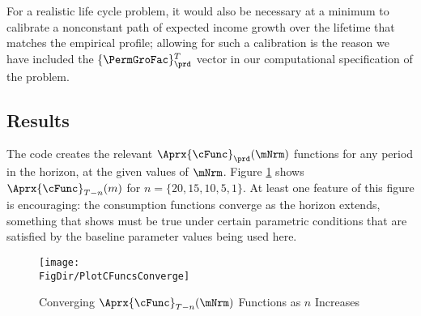 \documentclass[\econtexRoot/SolvingMicroDSOPs]{subfiles}
\begin{document}
For a realistic life cycle problem, it would also be necessary at a
minimum to calibrate a nonconstant path of expected income growth over the
lifetime that matches the empirical profile; allowing for such
a calibration is the reason we have included the $\{\PermGroFac\}_{\prd}^{T}$
vector in our computational specification of the problem.

\hypertarget{results}{}
\subsection{Results}

The code creates the relevant $\Aprx{\cFunc}_{\prd}(\mNrm)$ functions for any period in the horizon, at the given values of $\mNrm$.  Figure \ref{fig:PlotCFuncsConverge} shows $\Aprx{\cFunc}_{T-n}({m})$ for $n=\{20,15,10,5,1\}$.  At least one feature of this figure is encouraging: the consumption functions converge as the horizon extends, something that \cite{BufferStockTheory} shows must be true under certain parametric conditions that are satisfied by the baseline parameter values being used here.

\hypertarget{PlotCFuncsConverge}{}
\begin{figure}
  \texttt{[image: \\FigDir/PlotCFuncsConverge]}
  \caption{Converging $\Aprx{\cFunc}_{T-n}({\mNrm})$ Functions as $n$ Increases}
  \label{fig:PlotCFuncsConverge}
\end{figure}
\end{document}
